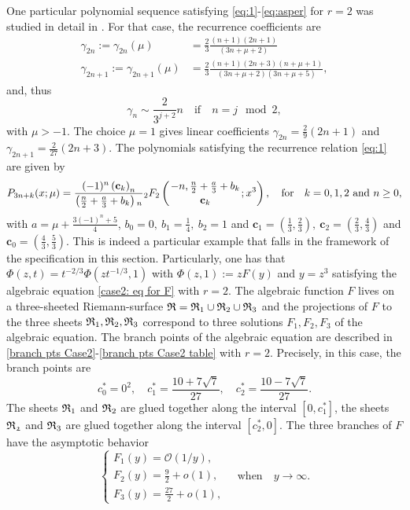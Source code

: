 \documentclass[12pt]{article}
\numberwithin{equation}{section}
\newcommand{\pFq}[5]{{}_{#1}F_{#2} \left( \genfrac{}{}{0pt}{}{#3}{#4}; #5 \right)  }
\begin{document}
One particular polynomial sequence  satisfying \eqref{eq:1}-\eqref{eq:asper} for \(r=2\) was studied in detail in  \cite[\S 3.1]{AnaWVA}. For that case, the recurrence coefficients are 
 \begin{align*}
	\gamma_{2n}:=\gamma_{2n}(\mu)&=\frac{2}{3 } \frac{(n+1)(2n+1)  }{(3n+\mu+2)} \\
    \gamma_{2n+1}:=\gamma_{2n +1}(\mu) &=  \frac{2}{3 }\frac{(n+1)(2n+3)(n+\mu+1) }{(3n+\mu+2)(3n+\mu+5)}, 
 \end{align*}
 and, thus
 \[
	\gamma_n \sim \frac{2}{3^{j+2}} n\quad \text{if} \quad n=j\mod 2, 
 \]
 with $\mu>-1$. The choice $\mu =1$ gives linear coefficients \(\gamma_{2n}=\frac{2}{9} (2n+1)\) and \( {\gamma_{2n +1} =  \frac{2}{27 }(2n+3)}.\)
 The polynomials satisfying the recurrence relation \eqref{eq:1} are given by 
  \[
 	P_{3n+k}(x;\mu) = \frac{(-1)^n  \left(\mathbf{c}_k\right)_n}{\left(\frac{n}{2}+\frac{a}{3}+b_k\right){}_n}
		\pFq{2}{2}{-n,\frac{n}{2}+\frac{a}{3}+b_k}{\mathbf{c}_k}
   	{x^3} 
	, \quad \text{for} \quad k=0,1,2\ \text{and} \ n\geq 0, 
 \]
 with \(a= \mu +\frac{3(-1)^n+5}{4}\), \(b_0=0,\ b_1=\frac14, \ b_2=1\) and \(\mathbf{c}_1=(\tfrac13,\tfrac23) ,\ \mathbf{c}_2=(\tfrac23,\tfrac43) \) and \(\mathbf{c}_0=(\tfrac43,\tfrac53) \). This is indeed a particular example that falls in the framework of the specification in this section. Particularly, one has that  $\Phi(z,t)= {t}^{-2/3} \Phi( z {t}^{-1/3},1)$ with $\Phi(z,1):=zF(y)$ and $y=z^3$ satisfying the algebraic equation \eqref{case2: eq for F} with $r=2$. 
The algebraic function $F$  lives on a three-sheeted Riemann-surface $\frak{R} = \frak{R}_1 \cup \frak{R}_2 \cup \frak{R}_3$ and
the projections of $F$ to the three sheets $\frak{R}_1, \frak{R}_2, \frak{R}_3$ correspond to three solutions $F_1,F_2,F_3$ of the algebraic equation.
The branch points of the algebraic equation are described in \eqref{branch pts Case2}-\eqref{branch pts Case2 table} with $r=2$. Precisely, in this case, the branch points are
\[   c_0^* =0^2, \quad c_1^* = \frac{10+7\sqrt{7}}{27}, \quad c_2^* =\frac{10-7\sqrt{7}}{27}.  \]
The sheets $\frak{R}_1$ and $\frak{R}_2$ are glued together along the interval $[0,c_1^* ]$, the sheets $\frak{R_2}$ and $\frak{R}_3$ are glued together
along the interval $[c_2^* ,0]$. The three branches of $F$ have the asymptotic behavior
\[  \begin{cases}   F_1(y) =  \mathcal{O}(1/y), \\
                    F_2(y) = \frac92  + {o}(1), \\
                    F_3(y) = \frac{27}{2} + {o}(1), 
    \end{cases}  \quad \text{when} \quad y \to \infty.\]
\end{document}
